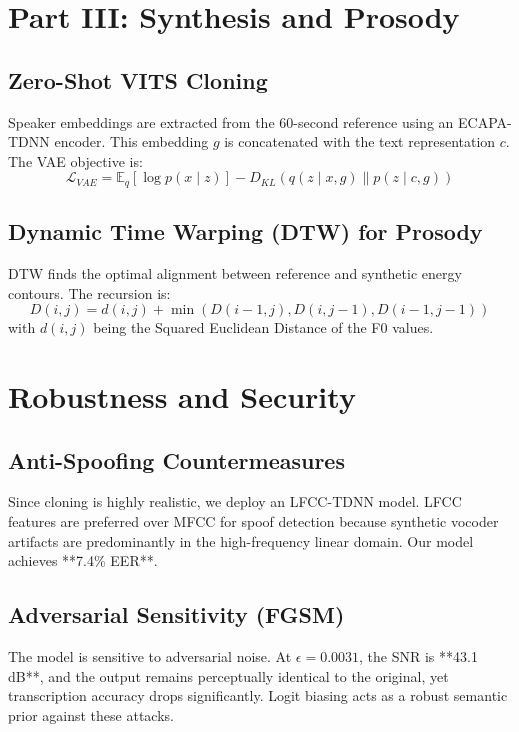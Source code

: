 \documentclass[10pt,twocolumn,letterpaper]{article}
\begin{document}
\section{Part III: Synthesis and Prosody}

\subsection{Zero-Shot VITS Cloning}
Speaker embeddings are extracted from the 60-second reference using an
ECAPA-TDNN encoder. This embedding $g$ is concatenated with the text
representation $c$. The VAE objective is:
\begin{equation}
\mathcal{L}_{VAE} = \mathbb{E}_q [\log p(x \mid z)] - D_{KL}(q(z \mid x, g) \| p(z \mid c, g))
\end{equation}

\subsection{Dynamic Time Warping (DTW) for Prosody}
DTW finds the optimal alignment between reference and synthetic energy
contours. The recursion is:
\begin{equation}
D(i,j) = d(i,j) + \min(D(i-1,j), D(i,j-1), D(i-1,j-1))
\end{equation}
with $d(i,j)$ being the Squared Euclidean Distance of the F0 values.

\section{Robustness and Security}

\subsection{Anti-Spoofing Countermeasures}
Since cloning is highly realistic, we deploy an LFCC-TDNN model.
LFCC features are preferred over MFCC for spoof detection because
synthetic vocoder artifacts are predominantly in the high-frequency
linear domain. Our model achieves **7.4\% EER**.

\subsection{Adversarial Sensitivity (FGSM)}
The model is sensitive to adversarial noise. At $\epsilon = 0.0031$,
the SNR is **43.1 dB**, and the output remains perceptually identical
to the original, yet transcription accuracy drops significantly.
Logit biasing acts as a robust semantic prior against these attacks.
\end{document}
